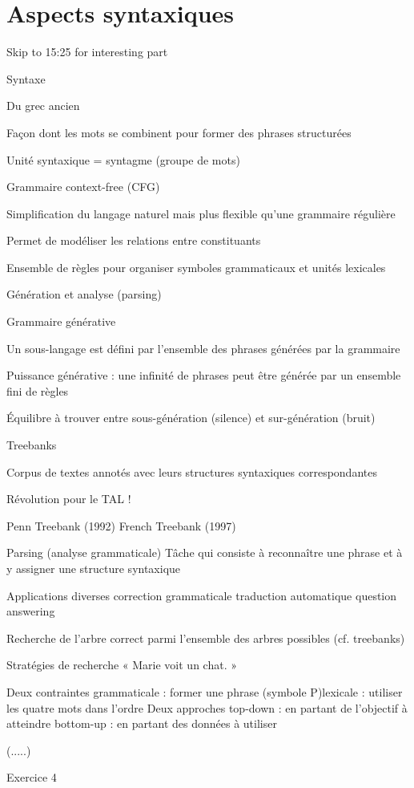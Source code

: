\vspace{-1.2cm}

\section{Aspects syntaxiques}

Skip to 15:25 for interesting part

Syntaxe

    Du grec ancien %

    Façon dont les mots se combinent pour former des phrases structurées

    Unité syntaxique = syntagme (groupe de mots)

Grammaire context-free (CFG)

    Simplification du langage naturel mais plus flexible qu'une grammaire régulière

    Permet de modéliser les relations entre constituants

    Ensemble de règles pour organiser symboles grammaticaux et unités lexicales

    Génération et analyse (parsing)

Grammaire générative

    Un sous-langage est défini par l'ensemble des phrases générées par la grammaire

    Puissance générative : une infinité de phrases peut être générée par un ensemble fini de règles

    Équilibre à trouver entre sous-génération (silence) et sur-génération (bruit)

Treebanks

    Corpus de textes annotés avec leurs structures syntaxiques correspondantes

    Révolution pour le TAL !

    Penn Treebank (1992)
    French Treebank (1997)

Parsing (analyse grammaticale)
    Tâche qui consiste à reconnaître une phrase et à y assigner une structure syntaxique

    Applications diverses
        correction grammaticale
        traduction automatique
        question answering

    Recherche de l'arbre correct parmi l'ensemble des arbres possibles (cf. treebanks)

Stratégies de recherche
    « Marie voit un chat. »

    Deux contraintes
        grammaticale : former une phrase (symbole P)lexicale : utiliser les quatre mots dans l'ordre
    Deux approches
        top-down : en partant de l'objectif à atteindre
        bottom-up : en partant des données à utiliser


(.....)

Exercice 4

